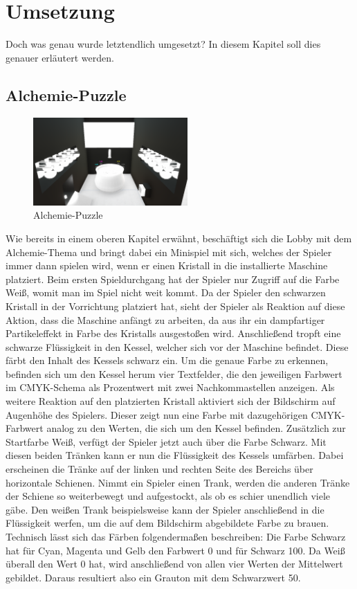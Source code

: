 \chapter{Umsetzung}
Doch was genau wurde letztendlich umgesetzt? In diesem Kapitel soll dies genauer erläutert werden.
\section{Alchemie-Puzzle}
\begin{figure}
	\vspace*{-0.5cm}
	\includegraphics[width=5.9cm]{Pictures/Alchemie}
	\caption{Alchemie-Puzzle}
	\vspace*{-0.5cm}
	\label{fig:alchemie_start}
\end{figure}
Wie bereits in einem oberen Kapitel erwähnt, beschäftigt sich die Lobby mit dem Alchemie-Thema und bringt dabei ein Minispiel mit sich, welches der Spieler immer dann spielen wird, wenn er einen Kristall in die installierte Maschine platziert. Beim ersten Spieldurchgang hat der Spieler nur Zugriff auf die Farbe Weiß, womit man im Spiel nicht weit kommt. Da der Spieler den schwarzen Kristall in der Vorrichtung platziert hat, sieht der Spieler als Reaktion auf diese Aktion, dass die Maschine anfängt zu arbeiten, da aus ihr ein dampfartiger Partikeleffekt in Farbe des Kristalls ausgestoßen wird. Anschließend tropft eine schwarze Flüssigkeit in den Kessel, welcher sich vor der Maschine befindet. Diese färbt den Inhalt des Kessels schwarz ein. Um die genaue Farbe zu erkennen, befinden sich um den Kessel herum vier Textfelder, die den jeweiligen Farbwert im CMYK-Schema als Prozentwert mit zwei Nachkommastellen anzeigen. Als weitere Reaktion auf den platzierten Kristall aktiviert sich der Bildschirm auf Augenhöhe des Spielers. Dieser zeigt nun eine Farbe mit dazugehörigen CMYK-Farbwert analog zu den Werten, die sich um den Kessel befinden. Zusätzlich zur Startfarbe Weiß, verfügt der Spieler jetzt auch über die Farbe Schwarz. Mit diesen beiden Tränken kann er nun die Flüssigkeit des Kessels umfärben. Dabei erscheinen die Tränke auf der linken und rechten Seite des Bereichs über horizontale Schienen. Nimmt ein Spieler einen Trank, werden die anderen Tränke der Schiene so weiterbewegt und aufgestockt, als ob es schier unendlich viele gäbe. Den weißen Trank beispielsweise kann der Spieler anschließend in die Flüssigkeit werfen, um die auf dem Bildschirm abgebildete Farbe zu brauen. Technisch lässt sich das Färben folgendermaßen beschreiben: Die Farbe Schwarz hat für Cyan, Magenta und Gelb den Farbwert 0 und für Schwarz 100. Da Weiß überall den Wert 0 hat, wird anschließend von allen vier Werten der Mittelwert gebildet. Daraus resultiert also ein Grauton mit dem Schwarzwert 50.\\
